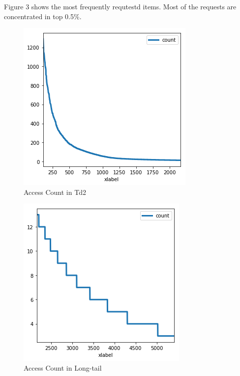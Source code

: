 \documentclass[sigconf,anonymous=false]{acmart}
\begin{document}
Figure 3 shows the most frequently requtestd items. Most of the requests are concentrated in top 0.5\%.

\begin{figure}[H]
    \centering
    \includegraphics[width=0.85\columnwidth]{figs/figure_03_td2.png}
    \caption{Access Count in Td2}
    \label{fig:my_label}
\end{figure}

\begin{figure}[H]
    \centering
    \includegraphics[width=0.85\columnwidth]{figs/figure_04_td3.png}
    \caption{Access Count in Long-tail}
    \label{fig:my_label}
\end{figure}
\end{document}

